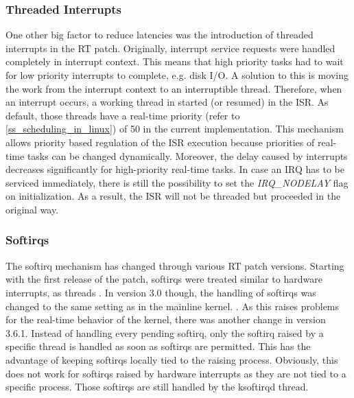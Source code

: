 \subsubsection{Threaded Interrupts}\label{ss_threaded_interrupts}
One other big factor to reduce latencies was the introduction of threaded interrupts in the RT patch.
Originally, interrupt service requests were handled completely in interrupt context.
This means that high priority tasks had to wait for low priority interrupts to complete, e.g. disk \ac{I/O}.
A solution to this is moving the work from the interrupt context to an interruptible thread.
Therefore, when an interrupt occurs, a working thread in started (or resumed) in the \ac{ISR}.
As default, those threads have a real-time priority (refer to \ref{ss_scheduling_in_linux}) of 50 in the current implementation.
This mechanism allows priority based regulation of the \ac{ISR} execution because priorities of real-time tasks can be changed dynamically. 
Moreover, the delay caused by interrupts decreases significantly for high-priority real-time tasks.
In case an \ac{IRQ} has to be serviced immediately, there is still the possibility to set the \textit{IRQ\_NODELAY} flag on initialization.
As a result, the \ac{ISR} will not be threaded but proceeded in the original way.

\subsubsection{Softirqs}
The softirq mechanism has changed through various \ac{RT} patch versions.
Starting with the first release of the patch, softirqs were treated similar to hardware interrupts, as threads \cite{rostedt:iotrtp}.
In version 3.0 though, the handling of softirqs was changed to the same setting as in the mainline kernel. \cite{corbet:siar}.
As this raises problems for the real-time behavior of the kernel, there was another change in version 3.6.1.
Instead of handling every pending softirq, only the softirq raised by a specific thread is handled as soon as softirqs are permitted. 
This has the advantage of keeping softirqs locally tied to the raising process.
Obviously, this does not work for softirqs raised by hardware interrupts as they are not tied to a specific process.
Those softirqs are still handled by the ksoftirqd thread.

